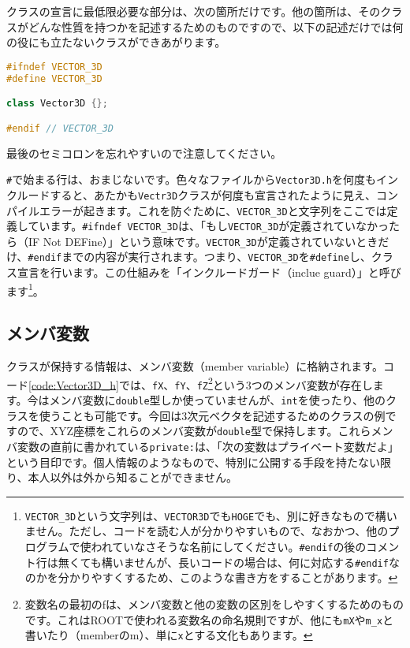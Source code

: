 クラスの宣言に最低限必要な部分は、次の箇所だけです。他の箇所は、そのクラスがどんな性質を持つかを記述するためのものですので、以下の記述だけでは何の役にも立たないクラスができあがります。
\begin{lstlisting}[language=c++]
#ifndef VECTOR_3D
#define VECTOR_3D

class Vector3D {};

#endif // VECTOR_3D
\end{lstlisting}
最後のセミコロンを忘れやすいので注意してください。

\texttt{\#}で始まる行は、おまじないです。色々なファイルから\texttt{Vector3D.h}を何度もインクルードすると、あたかも\texttt{Vectr3D}クラスが何度も宣言されたように見え、コンパイルエラーが起きます。これを防ぐために、\texttt{VECTOR\_3D}と文字列をここでは定義しています。\texttt{\#ifndef VECTOR\_3D}は、「もし\texttt{VECTOR\_3D}が定義されていなかったら（IF Not DEFine）」という意味です。\texttt{VECTOR\_3D}が定義されていないときだけ、\texttt{\#endif}までの内容が実行されます。つまり、\texttt{VECTOR\_3D}を\texttt{\#define}し、クラス宣言を行います。この仕組みを「インクルードガード（inclue guard）」と呼びます\footnote{\texttt{VECTOR\_3D}という文字列は、\texttt{VECTOR3D}でも\texttt{HOGE}でも、別に好きなもので構いません。ただし、コードを読む人が分かりやすいもので、なおかつ、他のプログラムで使われていなさそうな名前にしてください。\texttt{\#endif}の後のコメント行は無くても構いませんが、長いコードの場合は、何に対応する\texttt{\#endif}なのかを分かりやすくするため、このような書き方をすることがあります。}。

\subsection{メンバ変数}
\label{subsec:members}
クラスが保持する情報は、メンバ変数（member variable）に格納されます。コード\ref{code:Vector3D_h}では、\texttt{fX}、\texttt{fY}、\texttt{fZ}\footnote{変数名の最初のfは、メンバ変数と他の変数の区別をしやすくするためのものです。これはROOTで使われる変数名の命名規則ですが、他にも\texttt{mX}や\texttt{m\_x}と書いたり（memberのm）、単に\texttt{x}とする文化もあります。}という3つのメンバ変数が存在します。今はメンバ変数に\texttt{double}型しか使っていませんが、\texttt{int}を使ったり、他のクラスを使うことも可能です。今回は3次元ベクタを記述するためのクラスの例ですので、XYZ座標をこれらのメンバ変数が\texttt{double}型で保持します。これらメンバ変数の直前に書かれている\texttt{private:}は、「次の変数はプライベート変数だよ」という目印です。個人情報のようなもので、特別に公開する手段を持たない限り、本人以外は外から知ることができません。

